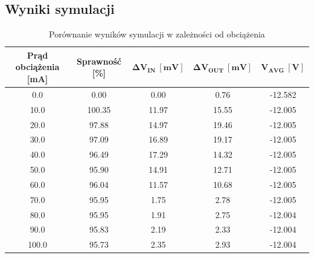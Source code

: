 \documentclass[11pt]{article}
\begin{document}
\subsection{Wyniki symulacji}
\begin{table}[H]
    \centering
    \caption{Porównanie wyników symulacji w zależności od obciążenia}
    \label{tab:efficiency_ripple}
    \begin{tabular}{ccccc}
        \toprule
        \textbf{Prąd obciążenia [mA]} & \textbf{Sprawność [\%]} & $\mathbf{\Delta{V_{IN}} \ [mV]}$ & $\mathbf{\Delta{V_{OUT}} \ [mV]}$ & $\mathbf{V_{AVG} \ [V]}$ \\
        \midrule
        0.0                           & 0.00                    & 0.00                             & 0.76                              & -12.582                  \\
        10.0                          & 100.35                  & 11.97                            & 15.55                             & -12.005                  \\
        20.0                          & 97.88                   & 14.97                            & 19.46                             & -12.005                  \\
        30.0                          & 97.09                   & 16.89                            & 19.17                             & -12.005                  \\
        40.0                          & 96.49                   & 17.29                            & 14.32                             & -12.005                  \\
        50.0                          & 95.90                   & 14.91                            & 12.71                             & -12.005                  \\
        60.0                          & 96.04                   & 11.57                            & 10.68                             & -12.005                  \\
        70.0                          & 95.95                   & 1.75                             & 2.78                              & -12.005                  \\
        80.0                          & 95.95                   & 1.91                             & 2.75                              & -12.004                  \\
        90.0                          & 95.83                   & 2.19                             & 2.33                              & -12.004                  \\
        100.0                         & 95.73                   & 2.35                             & 2.93                              & -12.004                  \\
        \bottomrule
    \end{tabular}
\end{table}
\end{document}
